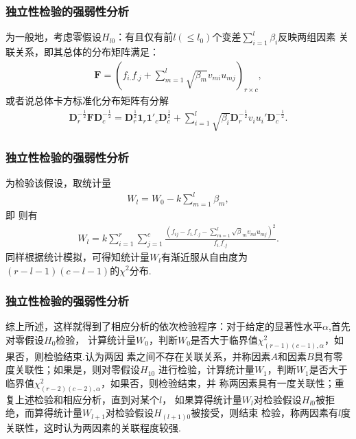 \begin{frame}\frametitle{\color{blue}独立性检验的强弱性分析}
 \begin{footnotesize}
 \quad\quad 为一般地，考虑零假设$H_{l0}$：有且仅有前$l(\leq l_{0})$个变差$\sum^{l}_{i=1}\beta_{i}$反映两组因素
关联关系，即其总体的分布矩阵满足：
\begin{eqnarray}
               \mathbf{F}=(f_{i.}f_{.j}+\sum^{l}_{m=1}\sqrt{\beta_{m}}v_{mi}u_{mj})_{r\times c},
\end{eqnarray}
或者说总体卡方标准化分布矩阵有分解
\begin{eqnarray}
     \mathbf{D}^{-\frac{1}{2}}_{r}\mathbf{F}\mathbf{D}^{-\frac{1}{2}}_{c}=
     \mathbf{D}^{\frac{1}{2}}_{r}\mathbf{1}_{r}\mathbf{1}'_{c}\mathbf{D}^{\frac{1}{2}}_{c}+
     \sum^{l}_{i=1}\sqrt{\beta_{i}}\mathbf{D}^{-\frac{1}{2}}_{r}v_{i}u_{i}'\mathbf{D}^{-\frac{1}{2}}_{c}.
\end{eqnarray}
\end{footnotesize}
\end{frame}
\begin{frame}\frametitle{\color{blue}独立性检验的强弱性分析}
 \begin{footnotesize}
  \quad\quad 为检验该假设，取统计量
\begin{eqnarray}
     W_{l}=W_{0}-k\sum^{l}_{m=1}\beta_{m},
\end{eqnarray}
即 则有
\begin{eqnarray}
                W_{l}= k\sum^{r}_{i=1}\sum^{c}_{j=1}\frac{(f_{ij}-f_{i.}f_{.j}-\sum^{l}_{m=1}\sqrt{\beta}_{m}v_{mi}u_{mj})^{2}}
                      {f_{i.}f_{.j}}.
\end{eqnarray}
同样根据统计模拟，可得知统计量$W_{l}$有渐近服从自由度为$(r-l-1)(c-l-1)$的$\chi^{2}$分布.\\
\end{footnotesize}
\end{frame}
\begin{frame}\frametitle{\color{blue}独立性检验的强弱性分析}
 \begin{footnotesize}
  \quad\quad 综上所述，这样就得到了相应分析的依次检验程序：对于给定的显著性水平$\alpha$,首先对零假设$H_{0}$检验，
计算统计量$W_{0}$，判断$W_{0}$是否大于临界值$\chi^{2}_{(r-1)(c-1),\alpha}$，如果否，则检验结束.认为两因
素之间不存在关联关系，并称因素$A$和因素$B$具有零度关联性；如果是，则对零假设$H_{10}$
进行检验，计算统计量$W_{1}$，判断$W_{1}$是否大于临界值$\chi^{2}_{(r-2)(c-2),\alpha}$，如果否，则检验结束，并
称两因素具有一度关联性；重复上述检验和相应分析，直到对某个$l$，
如果算得统计量$W_{l}$对检验假设$H_{l0}$被拒绝，而算得统计量$W_{l+1}$对检验假设$H_{(l+1)0}$被接受，则结束
检验，称两因素有$l$度关联性，这时认为两因素的关联程度较强.
\end{footnotesize}
\end{frame}
